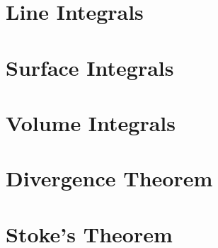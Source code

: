 \section{Line Integrals}

\section{Surface Integrals}

\section{Volume Integrals}

\section{Divergence Theorem}

\section{Stoke's Theorem}